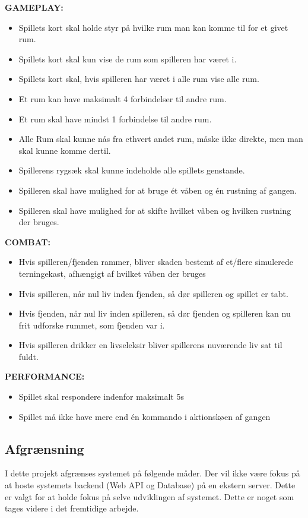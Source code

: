 \textbf{GAMEPLAY:}
\begin{itemize}
\item Spillets kort skal holde styr på hvilke rum man kan komme til for et givet rum.
\item Spillets kort skal kun vise de rum som spilleren har været i.
\item Spillets kort skal, hvis spilleren har været i alle rum vise alle rum.
\item Et rum kan have maksimalt 4 forbindelser til andre rum.
\item Et rum skal have mindst 1 forbindelse til andre rum.
\item Alle Rum skal kunne nås fra ethvert andet rum, måske ikke direkte, men man skal kunne komme dertil.
\item Spillerens rygsæk skal kunne indeholde alle spillets genstande.
\item Spilleren skal have mulighed for at bruge ét våben og én rustning af gangen.
\item Spilleren skal have mulighed for at skifte hvilket våben og hvilken rustning der bruges.

\end{itemize}
    
\textbf{COMBAT:}

\begin{itemize}
\item Hvis spilleren/fjenden rammer, bliver skaden bestemt af et/flere simulerede terningekast, afhængigt af hvilket våben der bruges
\item Hvis spilleren, når nul liv inden fjenden, så dør spilleren og spillet er tabt.
\item Hvis fjenden, når nul liv inden spilleren, så dør fjenden og spilleren kan nu frit udforske rummet, som fjenden var i.
\item Hvis spilleren drikker en livseleksir bliver spillerens nuværende liv sat til fuldt.
\end{itemize}

\textbf{PERFORMANCE:}    

\begin{itemize}
\item Spillet skal respondere indenfor maksimalt 5s
\item Spillet må ikke have mere end én kommando i aktionskøen af gangen
\end{itemize}

\newpage
    

\subsection{Afgrænsning}
I dette projekt afgrænses systemet på følgende måder. Der vil ikke være fokus på at hoste systemets backend (Web API og Database) på en ekstern server. Dette er valgt for at holde fokus på selve udviklingen af systemet. Dette er noget som tages videre i det fremtidige arbejde.  

